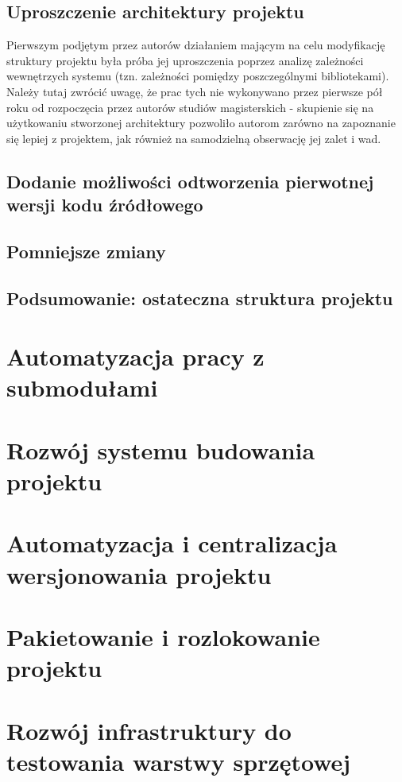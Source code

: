 \subsection{Uproszczenie architektury projektu}
Pierwszym podjętym przez autorów działaniem mającym na celu modyfikację struktury projektu była próba jej uproszczenia poprzez analizę zależności wewnętrzych systemu (tzn. zależności pomiędzy poszczególnymi bibliotekami). Należy tutaj zwrócić uwagę, że prac tych nie wykonywano przez pierwsze pół roku od rozpoczęcia przez autorów studiów magisterskich - skupienie się na użytkowaniu stworzonej architektury pozwoliło autorom zarówno na zapoznanie się lepiej z projektem, jak również na samodzielną obserwację jej zalet i wad. 






\subsection{Dodanie możliwości odtworzenia pierwotnej wersji kodu źródłowego}

\subsection{Pomniejsze zmiany}

\subsection{Podsumowanie: ostateczna struktura projektu}





\section{Automatyzacja pracy z submodułami}
\section{Rozwój systemu budowania projektu}
\section{Automatyzacja i centralizacja wersjonowania projektu}
\section{Pakietowanie i rozlokowanie projektu}
\section{Rozwój infrastruktury do testowania warstwy sprzętowej}

